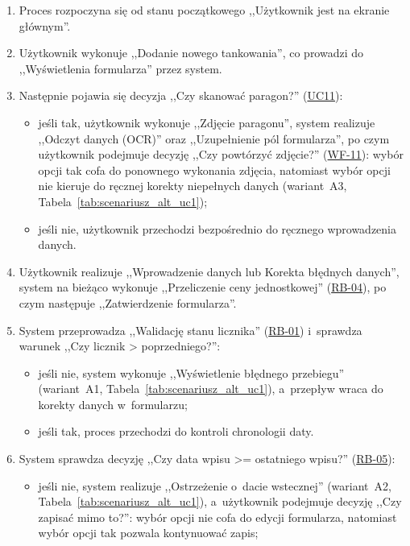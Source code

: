 \begin{enumerate}
    \item Proces rozpoczyna się od stanu początkowego ,,Użytkownik jest na ekranie głównym''.
    \item Użytkownik wykonuje ,,Dodanie nowego tankowania'', co prowadzi do ,,Wyświetlenia formularza'' przez system.
    \item Następnie pojawia się decyzja ,,Czy skanować paragon?'' (\hyperlink{uc:UC11}{UC11}):
    \begin{itemize}
        \item jeśli tak, użytkownik wykonuje ,,Zdjęcie paragonu'', system realizuje ,,Odczyt danych (OCR)'' oraz ,,Uzupełnienie pól formularza'', po czym użytkownik podejmuje decyzję ,,Czy powtórzyć zdjęcie?'' (\hyperlink{wf:WF-11}{WF-11}): wybór opcji tak cofa do ponownego wykonania zdjęcia, natomiast wybór opcji nie kieruje do ręcznej korekty niepełnych danych (wariant~A3, Tabela~\ref{tab:scenariusz_alt_uc1});
        \item jeśli nie, użytkownik przechodzi bezpośrednio do ręcznego wprowadzenia danych.
    \end{itemize}
    \item Użytkownik realizuje ,,Wprowadzenie danych lub Korekta błędnych danych'', system na bieżąco wykonuje ,,Przeliczenie ceny jednostkowej'' (\hyperlink{rb:RB-04}{RB-04}), po czym następuje ,,Zatwierdzenie formularza''.
    \item System przeprowadza ,,Walidację stanu licznika'' (\hyperlink{rb:RB-01}{RB-01}) i~sprawdza warunek ,,Czy licznik > poprzedniego?'':
    \begin{itemize}
        \item jeśli nie, system wykonuje ,,Wyświetlenie błędnego przebiegu'' (wariant~A1, Tabela~\ref{tab:scenariusz_alt_uc1}), a~przepływ wraca do korekty danych w~formularzu;
        \item jeśli tak, proces przechodzi do kontroli chronologii daty.
    \end{itemize}
    \item System sprawdza decyzję ,,Czy data wpisu >= ostatniego wpisu?'' (\hyperlink{rb:RB-05}{RB-05}):
    \begin{itemize}
        \item jeśli nie, system realizuje ,,Ostrzeżenie o~dacie wstecznej'' (wariant~A2, Tabela~\ref{tab:scenariusz_alt_uc1}), a~użytkownik podejmuje decyzję ,,Czy zapisać mimo to?'': wybór opcji nie cofa do edycji formularza, natomiast wybór opcji tak pozwala kontynuować zapis;

\end{itemize}
\end{enumerate}
